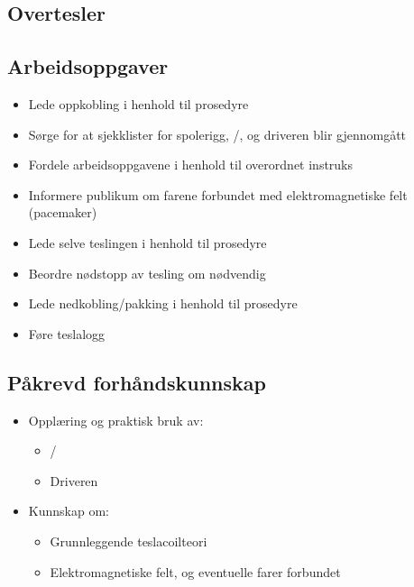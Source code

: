 \subsection{Overtesler}

\subsection*{Arbeidsoppgaver}
\begin{itemize}
\item{Lede oppkobling i henhold til prosedyre}
\item{Sørge for at sjekklister for spolerigg, \signalkilde/\pulsformer, og driveren blir gjennomgått}
\item{Fordele arbeidsoppgavene i henhold til overordnet instruks}
\item{Informere publikum om farene forbundet med elektromagnetiske felt (pacemaker)}
\item{Lede selve teslingen i henhold til prosedyre}
\item{Beordre nødstopp av tesling om nødvendig}
\item{Lede nedkobling/pakking i henhold til prosedyre}
\item{Føre teslalogg}
\end{itemize}


\subsection*{Påkrevd forhåndskunnskap}
\begin{itemize}
\item{Opplæring og praktisk bruk av:}
\begin{itemize}
\item{\signalkilde/\pulsformer}
\item{Driveren}
\iftoggle{INTERN}{
    \item{Hansken}
}{
}
\end{itemize}
\item{Kunnskap om:}
\begin{itemize}
\item{Grunnleggende teslacoilteori}
\item{Elektromagnetiske felt, og eventuelle farer forbundet}
\end{itemize}
\end{itemize}
